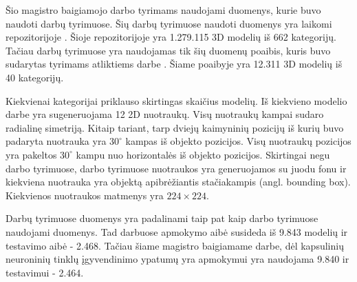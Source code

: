 Šio magistro baigiamojo darbo tyrimams naudojami duomenys, kurie buvo naudoti darbų \cite{cnnExp1, cnnExp2} tyrimuose. Šių darbų tyrimuose naudoti duomenys yra laikomi repozitorijoje \cite{dataRepo}. Šioje repozitorijoje yra 1.279.115 3D modelių iš 662 kategorijų. Tačiau darbų \cite{cnnExp1, cnnExp2} tyrimuose yra naudojamas tik šių duomenų poaibis, kuris buvo sudarytas tyrimams atliktiems darbe \cite{dbnExp}. Šiame poaibyje yra 12.311 3D modelių iš 40 kategorijų.

Kiekvienai kategorijai priklauso skirtingas skaičius modelių. Iš kiekvieno modelio darbe \cite{cnnExp2} yra sugeneruojama 12 2D nuotraukų. Visų nuotraukų kampai sudaro radialinę simetriją. Kitaip tariant, tarp dviejų kaimyninių pozicijų iš kurių buvo padaryta nuotrauka yra $30^{\circ}$ kampas iš objekto pozicijos. Visų nuotraukų pozicijos yra pakeltos $30^{\circ}$ kampu nuo horizontalės iš objekto pozicijos. Skirtingai negu darbo \cite{dbnExp} tyrimuose, darbo \cite{cnnExp2} tyrimuose nuotraukos yra generuojamos su juodu fonu ir kiekviena nuotrauka yra objektą apibrėžiantis stačiakampis (angl. bounding box). Kiekvienos nuotraukos matmenys yra $224\times224$.

Darbų \cite{cnnExp1, cnnExp2} tyrimuose duomenys yra padalinami taip pat kaip darbo \cite{dbnExp} tyrimuose naudojami duomenys. Tad darbuose \cite{cnnExp1, cnnExp2, dbnExp} apmokymo aibė susideda iš 9.843 modelių ir testavimo aibė - 2.468. Tačiau šiame magistro baigiamame darbe, dėl kapsulinių neuroninių tinklų įgyvendinimo ypatumų yra apmokymui yra naudojama 9.840 ir testavimui - 2.464.
